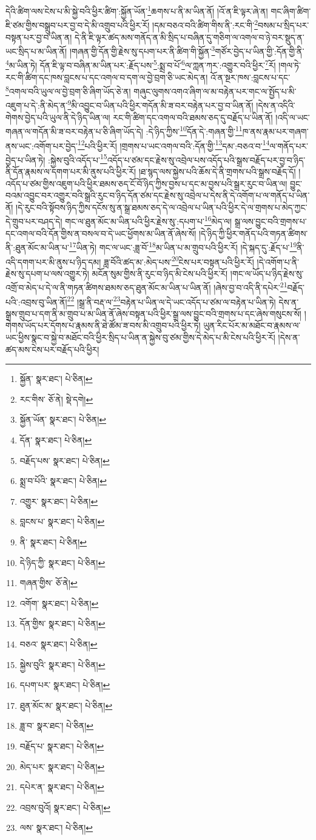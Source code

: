 དེའི་ཚིག་ལས་ངེས་པ་མི་སྐྱེ་བའི་ཕྱིར་ཚིག་:སྐྱོན་ཡོན་\footnote{སྐྱོན་  སྣར་ཐང་།  པེ་ཅིན། }ཆགས་པ་ནི་མ་ཡིན་ནོ། །འོ་ན་ཇི་ལྟར་ཞེ་ན། གང་ཞིག་ཚིག་ཇི་ཙམ་གྱིས་བསྒྲུབ་པར་བྱ་བ་དེ་མི་འགྲུབ་པའི་ཕྱིར་རོ། །དམ་བཅའ་བའི་ཚིག་གིས་ནི་:རང་གི་\footnote{རང་གིས་  ཅོ་ནེ།  སྡེ་དགེ། }བསམ་པ་སྲིད་པར་བསྟན་པར་བྱ་བ་ཡིན་ན། དེ་ནི་ཇི་ལྟར་ཚད་མས་གནོད་ན་མི་སྲིད་པ་བཞིན་དུ་གཅིག་ལ་འགལ་བ་ཉེ་བར་སྡུད་ན་ཡང་སྲིད་པ་མ་ཡིན་ནོ། །གཞན་གྱི་དོན་གྱི་རྗེས་སུ་དཔག་པར་ནི་ཚིག་གི་སྐྱོན་\footnote{སྐྱོན་ཡོན་  སྣར་ཐང་།  པེ་ཅིན། }གཙོར་བྱེད་པ་ཡིན་གྱི་:དོན་གྱི་ནི་\footnote{དོན་  སྣར་ཐང་།  པེ་ཅིན། }མ་ཡིན་ཏེ། དོན་ཇི་ལྟ་བ་བཞིན་མ་ཡིན་པར་:རྗོད་པས་\footnote{བརྗོད་པས་  སྣར་ཐང་།  པེ་ཅིན། }:སྨྲ་བ་པོ་\footnote{སྨྲ་བ་པོའི་  སྣར་ཐང་།  པེ་ཅིན། }ལ་ཀླན་ཀར་:འགྱུར་བའི་ཕྱིར་\footnote{འགྱུར་  སྣར་ཐང་།  པེ་ཅིན། }རོ། །གལ་ཏེ་རང་གི་ཚིག་དང་ཁས་བླངས་པ་དང་འགལ་བ་དག་ལ་བྱེ་བྲག་ཅི་ཡང་མེད་ན། འོ་ན་སྔར་ཁས་:བླངས་པ་དང་\footnote{བླངས་པ་  སྣར་ཐང་།  པེ་ཅིན། }འགལ་བའི་ཡུལ་ལ་བྱེ་བྲག་ཅི་ཞིག་ཡོད་ཅེ་ན། གཞུང་ལུགས་འགའ་ཞིག་ལ་མ་བརྟེན་པར་གང་ལ་སྤྱོད་པ་མི་འཇུག་པ་དེ་:ནི་མེད་ན་\footnote{ནི་  སྣར་ཐང་།  པེ་ཅིན། }མི་འབྱུང་བ་ཡིན་པའི་ཕྱིར་གདོན་མི་ཟ་བར་བརྟེན་པར་བྱ་བ་ཡིན་ནོ། །དེས་ན་འདིའི་གེགས་བྱེད་པའི་ཡུལ་ནི་དེ་ཉིད་ཡིན་ལ། རང་གི་ཚིག་དང་འགལ་བའི་ཐམས་ཅད་དུ་བརྗོད་པ་ཡིན་ནོ། །འདི་ལ་ཡང་གཞན་ལ་གདོན་མི་ཟ་བར་བརྟེན་པ་ཅི་ཞིག་ཡོད་དེ། :དེ་ཉིད་ཀྱིས་\footnote{དེ་ཉིད་ཀྱི་  སྣར་ཐང་།  པེ་ཅིན། }དོན་དེ་:གཞན་གྱི་\footnote{གཞན་གྱིས་  ཅོ་ནེ། }ཁ་ནས་རྣམ་པར་གཞག་ནས་ཡང་:འགོག་པར་བྱེད་\footnote{འགོག་  སྣར་ཐང་།  པེ་ཅིན། }པའི་ཕྱིར་རོ། །གྲགས་པ་ཡང་འགལ་བའི་:དོན་གྱི་\footnote{དོན་གྱིས་  སྣར་ཐང་།  པེ་ཅིན། }དམ་:བཅའ་བ་\footnote{བཅའ་  སྣར་ཐང་།  པེ་ཅིན། }ལ་གནོད་པར་བྱེད་པ་ཡིན་ཏེ། :སྐྱེས་བུའི་འདོད་པ་\footnote{སྐྱེས་བུའི་  སྣར་ཐང་།  པེ་ཅིན། }འདོད་པ་ཙམ་དང་རྗེས་སུ་འབྲེལ་པས་འདོད་པའི་སྒྲས་བརྗོད་པར་བྱ་བ་ཉིད་ནི་དོན་རྣམས་ལ་དགག་པར་མི་ནུས་པའི་ཕྱིར་རོ། །ཐ་སྙད་ལས་སྐྱེས་པའི་ཆོས་དེ་ནི་གྲགས་པའི་སྒྲས་བརྗོད་དོ། །འདོད་པ་ཙམ་གྱིས་འཇུག་པའི་ཕྱིར་ཐམས་ཅད་ངོ་བོ་ཉིད་ཀྱིས་བྱས་པ་དང་མ་བྱས་པའི་སྒྲར་རུང་བ་ཡིན་ལ། བྱུང་བའམ་འབྱུང་བར་འགྱུར་བའི་སྒྲའི་རུང་བ་ཉིད་དོན་ཙམ་དང་རྗེས་སུ་འབྲེལ་པ་དེས་ནི་དེ་འགོག་པ་ལ་གནོད་པ་ཡིན་ནོ། །དེ་རུང་བའི་སྟོབས་ཉིད་ཀྱིས་དངོས་སུ་ན་སྒྲ་ཐམས་ཅད་དེ་ལ་འབྲེལ་པ་ཡིན་པའི་ཕྱིར་དེ་ལ་གྲགས་པ་མེད་ཀྱང་དེ་གྲུབ་པར་བཤད་དེ། གང་ལ་ཐུན་མོང་མ་ཡིན་པའི་ཕྱིར་རྗེས་སུ་:དཔག་པ་\footnote{དཔག་པར་  སྣར་ཐང་།  པེ་ཅིན། }མེད་ལ། སྒྲ་ལས་བྱུང་བའི་གྲགས་པ་དང་འགལ་བའི་དོན་གྱིས་ན་བསལ་བ་དེ་ཡང་ཕྱོགས་མ་ཡིན་ནོ་ཞེས་སོ། །དེ་ཉིད་ཀྱི་ཕྱིར་གནོད་པའི་གཏན་ཚིགས་ནི་:ཐུན་མོང་མ་ཡིན་པ་\footnote{ཐུན་མོང་མ་  སྣར་ཐང་།  པེ་ཅིན། }ཡིན་ཏེ། གང་ལ་ཡང་:ཟླ་བོ་\footnote{ཟླ་བ་  སྣར་ཐང་།  པེ་ཅིན། }མ་ཡིན་པ་མ་གྲུབ་པའི་ཕྱིར་རོ། །དེ་སྐད་དུ་:རྗོད་པ་\footnote{བརྗོད་པ་  སྣར་ཐང་།  པེ་ཅིན། }ནི་འདི་དགག་པར་མི་ནུས་པ་ཉིད་དམ། ཟླ་བོའི་ཚད་མ་:མེད་པས་\footnote{མེད་པར་  སྣར་ཐང་།  པེ་ཅིན། }ངེས་པར་བསྟན་པའི་ཕྱིར་རོ། །དེ་འགོག་པ་ནི་རྗེས་སུ་དཔག་པ་ལས་འགྱུར་ཏེ། མངོན་སུམ་གྱིས་ནི་རུང་བ་ཉིད་མི་ངེས་པའི་ཕྱིར་རོ། །གང་ལ་ཡོད་པ་ཉིད་རྗེས་སུ་འགྲོ་བ་མེད་པ་དེ་ལ་ནི་གཏན་ཚིགས་ཐམས་ཅད་ཐུན་མོང་མ་ཡིན་པ་ཡིན་ནོ། །ཞེས་བྱ་བ་འདི་ནི་དཔེར་\footnote{དཔེར་ན་  སྣར་ཐང་།  པེ་ཅིན། }བརྗོད་པའི་:འབྲས་བུ་ཡིན་ནོ།\footnote{འབྲས་བུའོ།  སྣར་ཐང་།  པེ་ཅིན། } །སྒྲ་ནི་བརྡ་ལ་\footnote{ལས་  སྣར་ཐང་།  པེ་ཅིན། }བརྟེན་པ་ཡིན་ལ་དེ་ཡང་འདོད་པ་ཙམ་ལ་བརྟེན་པ་ཡིན་ཏེ། དེས་ན་སྒྲས་གྲུབ་པ་དག་ནི་མ་གྲུབ་པ་མ་ཡིན་ནོ་ཞེས་བསྟན་པའི་ཕྱིར་སྒྲ་ལས་བྱུང་བའི་གྲགས་པ་དང་ཞེས་གསུངས་སོ། །གེགས་ཡོད་པར་དོགས་པ་རྣམས་ནི་ཐེ་ཚོམ་ཟ་བས་མི་འགྲུབ་པའི་ཕྱིར་ཏེ། ཡུན་རིང་པོར་མ་མཐོང་བ་རྣམས་ལ་ཡང་ཕྱིས་སྣང་བ་སྐྱེ་བ་མཐོང་བའི་ཕྱིར་སྲིད་པ་ཡིན་ན་སྐྱེས་བུ་ཙམ་གྱིས་དེ་མེད་པ་མི་ངེས་པའི་ཕྱིར་རོ། །དེས་ན་ཚད་མས་ངེས་པར་བརྗོད་པའི་ཕྱིར། 